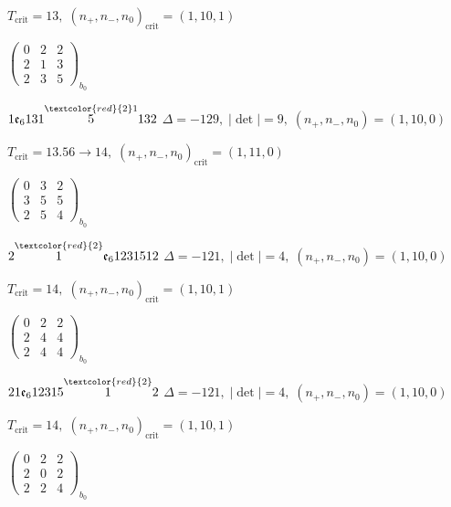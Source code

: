 \documentclass[10pt]{article}
\begin{document}
\hspace{1em}$T_{\text{crit}}=13,\; (n_+,n_-,n_0)_{\text{crit}}=(1,10,1)$

\hspace{2em}$\left(\begin{smallmatrix}0 & 2 & 2 \\ 2 & 1 & 3 \\ 2 & 3 & 5\end{smallmatrix}\right)_{\!b_0}$

\smallskip

$1\mathfrak{e}_6131\overset{\textcolor{red}{2}1}{5}132$ \quad $\Delta=-129,\; |\det|=9,\; (n_+,n_-,n_0)=(1,10,0)$

\hspace{1em}$T_{\text{crit}}=13.56 \to 14,\; (n_+,n_-,n_0)_{\text{crit}}=(1,11,0)$

\hspace{2em}$\left(\begin{smallmatrix}0 & 3 & 2 \\ 3 & 5 & 5 \\ 2 & 5 & 4\end{smallmatrix}\right)_{\!b_0}$

\smallskip

$2\overset{\textcolor{red}{2}}{1}\mathfrak{e}_61231512$ \quad $\Delta=-121,\; |\det|=4,\; (n_+,n_-,n_0)=(1,10,0)$

\hspace{1em}$T_{\text{crit}}=14,\; (n_+,n_-,n_0)_{\text{crit}}=(1,10,1)$

\hspace{2em}$\left(\begin{smallmatrix}0 & 2 & 2 \\ 2 & 4 & 4 \\ 2 & 4 & 4\end{smallmatrix}\right)_{\!b_0}$

$21\mathfrak{e}_612315\overset{\textcolor{red}{2}}{1}2$ \quad $\Delta=-121,\; |\det|=4,\; (n_+,n_-,n_0)=(1,10,0)$

\hspace{1em}$T_{\text{crit}}=14,\; (n_+,n_-,n_0)_{\text{crit}}=(1,10,1)$

\hspace{2em}$\left(\begin{smallmatrix}0 & 2 & 2 \\ 2 & 0 & 2 \\ 2 & 2 & 4\end{smallmatrix}\right)_{\!b_0}$
\end{document}
